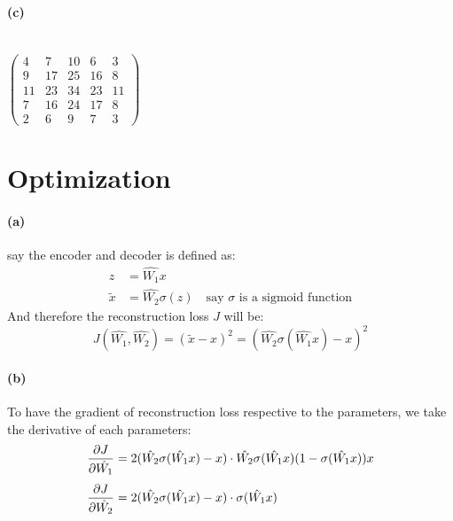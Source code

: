 \documentclass{article}
\begin{document}
\paragraph{(c)} \\
$\begin{pmatrix}
  4 & 7 & 10 & 6 & 3 \\[0.4em]
  9 & 17 & 25 & 16 & 8 \\[0.4em]
  11 & 23 & 34 & 23 & 11 \\[0.4em]
  7 & 16 & 24 & 17 & 8 \\[0.4em]
  2 & 6 & 9 &7 & 3
\end{pmatrix}$ \\


\section{Optimization}
\paragraph{(a)} say the encoder and decoder is defined as:
\begin{equation}
\begin{align}
z &= \hat{W_1}x \\[0.4em]
\tilde{x} &= \hat{W_2}\sigma(z)  \quad \text{say $\sigma$ is a sigmoid function}
\end{align}
\end{equation}
And therefore the reconstruction loss $J$ will be:
\begin{equation}
J(\hat{W_1}, \hat{W_2}) = (\tilde{x}-x)^2 = (\hat{W_2}\sigma(\hat{W_1}x)-x)^2
\end{equation}

\paragraph{(b)} To have the gradient of reconstruction loss respective to the parameters, we take the derivative of each parameters:
\begin{equation}
\begin{align}
{\partial J \over \partial \hat{W_1}} &= 2(\hat{W_2}\sigma(\hat{W_1}x)-x) \cdot \hat{W_2}\sigma(\hat{W_1}x)(1-\sigma(\hat{W_1}x))x \\[0.4em]
{\partial J \over \partial \hat{W_2}} &= 2(\hat{W_2}\sigma(\hat{W_1}x)-x) \cdot \sigma(\hat{W_1}x)
\end{align}
\end{equation}
\end{document}
